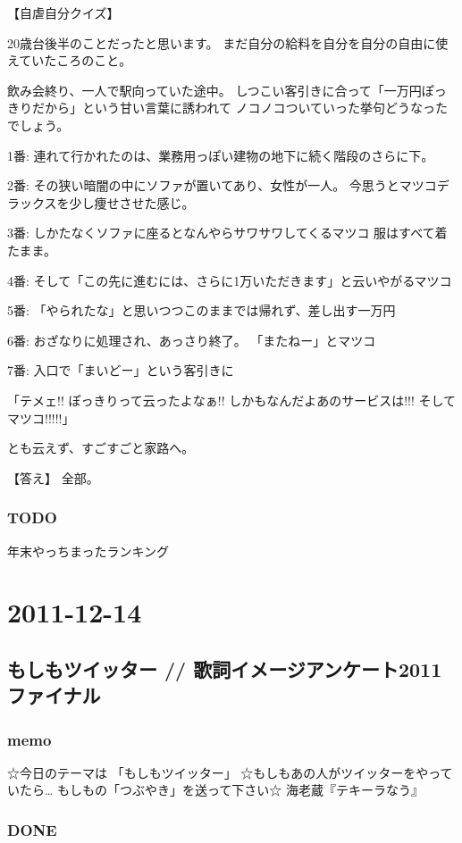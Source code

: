 \documentclass[11pt]{article}
\begin{document}
【自虐自分クイズ】

20歳台後半のことだったと思います。
まだ自分の給料を自分を自分の自由に使えていたころのこと。

飲み会終り、一人で駅向っていた途中。
しつこい客引きに合って「一万円ぽっきりだから」という甘い言葉に誘われて
ノコノコついていった挙句どうなったでしょう。

1番:
連れて行かれたのは、業務用っぽい建物の地下に続く階段のさらに下。

2番:
その狭い暗闇の中にソファが置いてあり、女性が一人。
今思うとマツコデラックスを少し痩せさせた感じ。

3番:
しかたなくソファに座るとなんやらサワサワしてくるマツコ
服はすべて着たまま。

4番:
そして「この先に進むには、さらに1万いただきます」と云いやがるマツコ

5番:
「やられたな」と思いつつこのままでは帰れず、差し出す一万円

6番:
おざなりに処理され、あっさり終了。
「またねー」とマツコ

7番:
入口で「まいどー」という客引きに

「テメェ!! ぽっきりって云ったよなぁ!! しかもなんだよあのサービスは!!! そしてマツコ!!!!!」

とも云えず、すごすごと家路へ。

【答え】
全部。
\subsubsection{\textbf{TODO}}
\label{sec-20_1_2}

年末やっちまったランキング
\section{2011-12-14}
\label{sec-21}
\subsection{もしもツイッター // 歌詞イメージアンケート2011ファイナル}
\label{sec-21_1}
\subsubsection{memo}
\label{sec-21_1_1}

☆今日のテーマは 「もしもツイッター」 ☆もしもあの人がツイッターをやっていたら… もしもの「つぶやき」を送って下さい☆
海老蔵『テキーラなう』
\subsubsection{\textbf{DONE}}
\label{sec-21_1_2}
\end{document}
